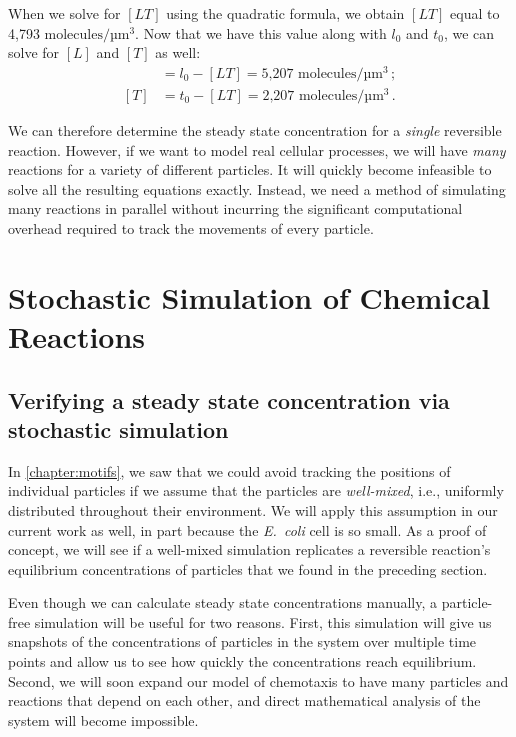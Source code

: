 When we solve for $[LT]$ using the quadratic formula, we obtain $[LT]$ equal to 4,793 $\text{molecules}/\text{µm}^3$. Now that we have this value along with $l_0$ and $t_0$, we can solve for $[L]$ and $[T]$ as well:
\begin{align*}
[L] & = l_0 - [LT] = \text{5,207 molecules}/\text{µm}^3\,;\\
[T] & = t_0 - [LT] = \text{2,207 molecules}/\text{µm}^3\,.
\end{align*}

We can therefore determine the steady state concentration for a \textit{single} reversible reaction. However, if we want to model real cellular processes, we will have \textit{many} reactions for a variety of different particles. It will quickly become infeasible to solve all the resulting equations exactly. Instead, we need a method of simulating many reactions in parallel without incurring the significant computational overhead required to track the movements of every particle.\\

\FloatBarrier
{}

\section{Stochastic Simulation of Chemical Reactions}
\label{sec:stochastic_simulation_of_chemical_reactions}
\subsection{Verifying a steady state concentration via stochastic simulation}

In \autoref{chapter:motifs}, we saw that we could avoid tracking the positions of individual particles if we assume that the particles are \textit{well-mixed}, i.e., uniformly distributed throughout their environment. We will apply this assumption in our current work as well, in part because the \textit{E.~coli} cell is so small. As a proof of concept, we will see if a well-mixed simulation replicates a reversible reaction's equilibrium concentrations of particles that we found in the preceding section.

Even though we can calculate steady state concentrations manually, a particle-free simulation will be useful for two reasons. First, this simulation will give us snapshots of the concentrations of particles in the system over multiple time points and allow us to see how quickly the concentrations reach equilibrium. Second, we will soon expand our model of chemotaxis to have many particles and reactions that depend on each other, and direct mathematical analysis of the system will become impossible.\\

